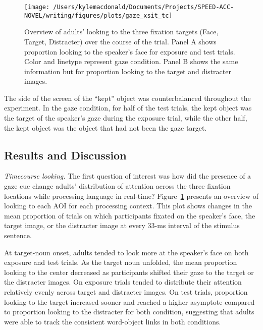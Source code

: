\documentclass[man,floatsintext]{apa6}
\begin{document}
\begin{figure}[!t]

{\centering \texttt{[image: /Users/kylemacdonald/Documents/Projects/SPEED-ACC-NOVEL/writing/figures/plots/gaze\_xsit\_tc]} 

}

\caption{Overview of adults' looking to the three fixation targets (Face, Target, Distracter) over the course of the trial. Panel A shows proportion looking to the speaker's face for exposure and test trials. Color and linetype represent gaze condition. Panel B shows the same information but for proportion looking to the target and distracter images.}\label{fig:gaze-xsit-tc-plot}
\end{figure}

The side of the screen of the \enquote{kept} object was counterbalanced
throughout the experiment. In the gaze condition, for half of the test
trials, the kept object was the target of the speaker's gaze during the
exposure trial, while the other half, the kept object was the object
that had not been the gaze target.

\subsection{Results and Discussion}\label{results-and-discussion-1}

\emph{Timecourse looking.} The first question of interest was how did
the presence of a gaze cue change adults' distribution of attention
across the three fixation locations while processing language in
real-time? Figure~\ref{fig:gaze-xsit-tc-plot} presents an overview of
looking to each AOI for each processing context. This plot shows changes
in the mean proportion of trials on which participants fixated on the
speaker's face, the target image, or the distracter image at every 33-ms
interval of the stimulus sentence.

At target-noun onset, adults tended to look more at the speaker's face
on both exposure and test trials. As the target noun unfolded, the mean
proportion looking to the center decreased as participants shifted their
gaze to the target or the distracter images. On exposure trials tended
to distribute their attention relatively evenly across target and
distracter images. On test trials, proportion looking to the target
increased sooner and reached a higher asymptote compared to proportion
looking to the distracter for both condition, suggesting that adults
were able to track the consistent word-object links in both conditions.
\end{document}
